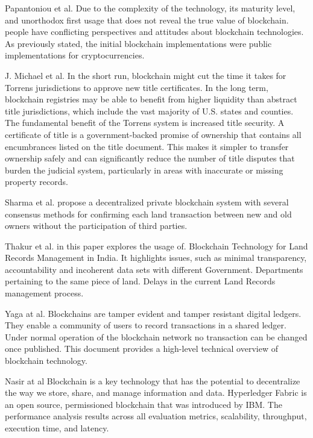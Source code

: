 \documentclass[12pt]{ucthesis}
\begin{document}
Papantoniou et al.\cite{rf2} Due to the complexity of the technology, its maturity level, and unorthodox first usage that does not reveal the true value of blockchain. people have conflicting perspectives and attitudes about blockchain technologies. As previously stated, the initial blockchain implementations were public implementations for cryptocurrencies.

J. Michael et al.\cite{rf7} In the short run, blockchain might cut the time it takes for Torrens jurisdictions to approve new title certificates. In the long term, blockchain registries may be able to benefit from higher liquidity than abstract title jurisdictions, which include the vast majority of U.S. states and counties. The fundamental benefit of the Torrens system is increased title security. A certificate of title is a government-backed promise of ownership that contains all encumbrances listed on the title document. This makes it simpler to transfer ownership safely and can significantly reduce the number of title disputes that burden the judicial system, particularly in areas with inaccurate or missing property records.
 

Sharma et al.\cite{rf6} propose a decentralized private blockchain system with several consensus methods for confirming each land transaction between new and old owners without the participation of third parties.




Thakur et al. \cite{ref_14} in this paper explores the usage of. Blockchain Technology for Land Records Management in India. It highlights issues, such as minimal transparency, accountability and incoherent data sets with different Government. Departments pertaining to the same piece of land. Delays in the current Land Records management process.

Yaga at al.\cite{rf5} Blockchains are tamper evident and tamper resistant digital ledgers. They enable a community of users to record transactions in a shared ledger. Under normal operation of the blockchain network no transaction can be changed once published. This document provides a high-level technical overview of blockchain technology.

 Nasir at al \cite{rf21} Blockchain is a key technology that has the potential to decentralize the way we store, share, and manage information and data. Hyperledger Fabric is an open source, permissioned blockchain that was introduced by IBM. The performance analysis results across all evaluation metrics, scalability, throughput, execution time, and latency.
 
\end{document}
